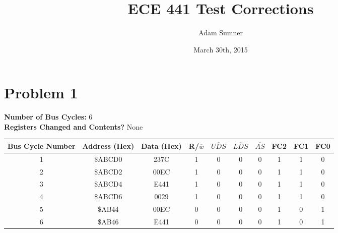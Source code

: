 \documentclass[12pt]{article}
\title{\textbf{ECE 441 Test Corrections}}
\author{Adam Sumner}
\date{March 30th, 2015}
\begin{document}
\maketitle

\section*{Problem 1}

\textbf{Number of Bus Cycles: }6\\
\textbf{Registers Changed and Contents? }None
\begin{table}[H]
	\centering
	\begin{adjustbox}{max width=\textwidth}
	\begin{tabulary}{1.1\textwidth}{|c|c|c|c|c|c|c|c|c|c|}
		\hline
			\textbf{Bus Cycle Number}	&	\textbf{Address (Hex)}	&	\textbf{Data (Hex)}	&	R/$\overline{w}$	&	$\overline{UDS}$	&	$\overline{LDS}$	&	$\overline{AS}$	&	FC2	&	FC1	&	FC0 \\ \hline
		
		1	&	\$ABCD0	&	237C	&	1	&	0	&	0	&	0	&	1	&	1	&	0	\\	\hline
		
		2	&	\$ABCD2	&	00EC	&	1	&	0	&	0	&	0	&	1	&	1	&	0	\\	\hline
		
		3	&	\$ABCD4	&	E441	&	1	&	0	&	0	&	0	&	1	&	1	&	0	\\ \hline
		
		4	&	\$ABCD6	&	0029	&	1	&	0	&	0	&	0	&	1	&	1	&	0	\\ \hline
		
		5	&	\$AB44	&	00EC	&	0	&	0	&	0	&	0	&	1	&	0	&	1	\\ \hline
		
		6	&	\$AB46	&	E441	&	0	&	0	&	0	&	0	&	1	&	0	&	1	\\ \hline
		\end{tabulary}
	\end{adjustbox}
\end{table}
\end{document}
